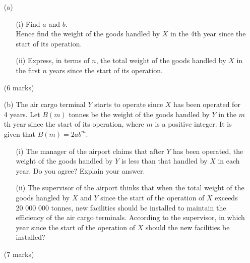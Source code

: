 \documentclass[12pt]{article}
\begin{document}
\begin{enumerate}
	\begin{enumerate}
		\item[(a)]
		\begin{enumerate}
			\item[(i)] Find $a$ and $b$. \\
			Hence find the weight of the goods handled by $X$ in the 4th year since the start of its operation.
			\item[(ii)] Express, in terms of $n$, the total weight of the goods handled by $X$ in the first $n$ years since the start of its operation.
		\end{enumerate}
		(6 marks)
		\item[(b)] The air cargo terminal $Y$ starts to operate since $X$ has been operated for 4 years. Let $B(m)$ tonnes be the weight of the goods handled by $Y$ in the $m$th year since the start of its operation, where $m$ is a positive integer. It is given that $B(m) = 2ab^m$.
		\begin{enumerate}
			\item[(i)] The manager of the airport claims that after $Y$ has been operated, the weight of the goods handled by $Y$ is less than that handled by $X$ in each year. Do you agree? Explain your answer.
			\item[(ii)] The supervisor of the airport thinks that when the total weight of the goods hangled by $X$ and $Y$ since the start of the operation of $X$ exceeds 20 000 000 tonnes, new facilities should be installed to maintain the efficiency of the air cargo terminals. According to the supervisor, in which year since the start of the operation of $X$ should the new facilities be installed?
		\end{enumerate}
		(7 marks)
	\end{enumerate}
\end{enumerate}
\end{document}
